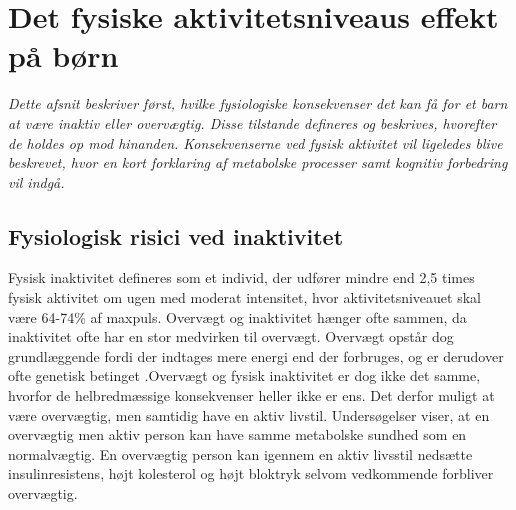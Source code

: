 \section{Det fysiske aktivitetsniveaus effekt på børn}\label{sec:fysio}
\textit{Dette afsnit beskriver først, hvilke fysiologiske konsekvenser det kan få for et barn at være inaktiv eller overvægtig. Disse tilstande defineres og beskrives, hvorefter de holdes op mod hinanden. Konsekvenserne ved fysisk aktivitet vil ligeledes blive beskrevet, hvor en kort forklaring af metabolske processer samt kognitiv forbedring vil indgå.}

\subsection{Fysiologisk risici ved inaktivitet}\label{subsec:inover}

Fysisk inaktivitet defineres som et individ, der udfører mindre end 2,5 times fysisk aktivitet om ugen med moderat intensitet, hvor aktivitetsniveauet skal være 64-74\% af maxpuls. \citep{Kiens2007} \newline
Overvægt og inaktivitet hænger ofte sammen, da inaktivitet ofte har en stor medvirken til overvægt. Overvægt opstår dog grundlæggende fordi der indtages mere energi end der forbruges, og er derudover ofte genetisk betinget \citep{Nestle2014}.Overvægt og fysisk inaktivitet er dog ikke det samme, hvorfor de helbredmæssige konsekvenser heller ikke er ens. Det derfor muligt at være overvægtig, men samtidig have en aktiv livstil. \citep{Kiens2007} Undersøgelser viser, at en overvægtig men aktiv person kan have samme metabolske sundhed som en normalvægtig. En overvægtig person kan igennem en aktiv livsstil nedsætte insulinresistens, højt kolesterol og højt bloktryk selvom vedkommende forbliver overvægtig. \citep{Lunau2012,Marcelino2012}

